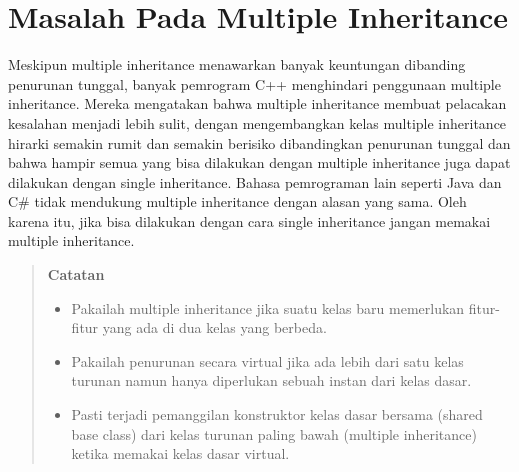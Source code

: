 \section{Masalah Pada Multiple Inheritance}\label{masalah-pada-multiple-inheritance}

Meskipun multiple inheritance menawarkan banyak keuntungan dibanding
penurunan tunggal, banyak pemrogram C++ menghindari penggunaan multiple
inheritance. Mereka mengatakan bahwa multiple inheritance membuat
pelacakan kesalahan menjadi lebih sulit, dengan mengembangkan kelas
multiple inheritance hirarki semakin rumit dan semakin berisiko
dibandingkan penurunan tunggal dan bahwa hampir semua yang bisa
dilakukan dengan multiple inheritance juga dapat dilakukan dengan single
inheritance. Bahasa pemrograman lain seperti Java dan C\# tidak
mendukung multiple inheritance dengan alasan yang sama. Oleh karena itu,
jika bisa dilakukan dengan cara single inheritance jangan memakai
multiple inheritance.

\begin{quotation}
 {\LARGE {}} \textbf{Catatan}
	\begin{itemize}
 \item Pakailah multiple inheritance jika suatu kelas baru memerlukan
 fitur-fitur yang ada di dua kelas yang berbeda.
 \item Pakailah penurunan secara virtual jika ada lebih dari satu kelas turunan
 namun hanya diperlukan sebuah instan dari kelas dasar.
 \item Pasti terjadi pemanggilan konstruktor kelas dasar bersama (shared base
 class) dari kelas turunan paling bawah (multiple inheritance) ketika
 memakai kelas dasar virtual.
	\end{itemize}
\end{quotation}



